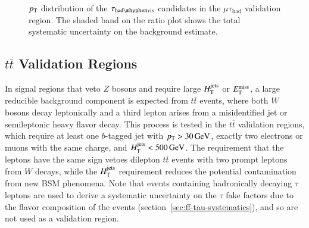 \begin{figure}[htbp]
  \centering
  \caption{$p_{\text{T}}$ distribution of the $\tauhadvis$ candidates in the $\mu\tau_{\mathrm{had}}$ validation region. The shaded band on the ratio plot shows the total systematic uncertainty on the background estimate.}
  \label{fig:model-independent-VR-mutau}
\end{figure}


\subsection{$t\overline{t}$ Validation Regions}\label{sec:model-independent-validation-regions-ttbar}
In signal regions that veto $Z$ bosons and require large $H_{\mathrm{T}}^{\mathrm{jets}}$ or $E_{\text{T}}^{\text{miss}}$, a large reducible background component is expected from $t\overline{t}$ events, where both $W$ bosons decay leptonically and a third lepton arises from a misidentified jet or semileptonic heavy flavor decay. This process is tested in the $t\overline{t}$ validation regions, which require at least one $b$-tagged jet with $p_{\text{T}}>\SI{30}{\giga\electronvolt}$, exactly two electrons or muons with the same charge, and $H_{\mathrm{T}}^{\mathrm{jets}}<\SI{500}{\giga\electronvolt}$. The requirement that the leptons have the same sign vetoes dilepton $t\overline{t}$ events with two prompt leptons from $W$ decays, while the $H_{\mathrm{T}}^{\mathrm{jets}}$ requirement reduces the potential contamination from new BSM phenomena. Note that events containing hadronically decaying $\tau$ leptons are used to derive a systematic uncertainty on the $\tau$ fake factors due to the flavor composition of the events (section~\ref{sec:ff-tau-systematics}), and so are not used as a validation region. 

